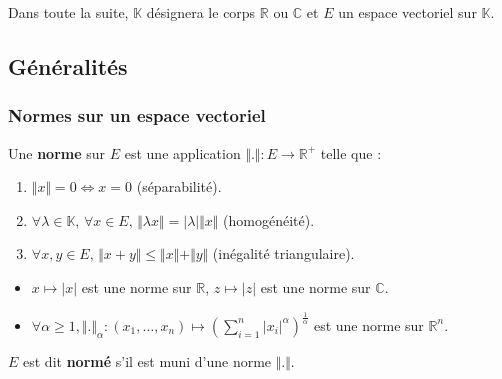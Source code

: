 




  Dans toute la suite, $\mathbb{K}$ désignera le corps $\mathbb{R}$ ou $\mathbb{C}$ et $E$ un espace vectoriel sur $\mathbb{K}$.

  \subsection{Généralités}

  \subsubsection{Normes sur un espace vectoriel}


  \begin{definition}
    Une \textbf{norme} sur $E$ est une application $\Vert . \Vert : E \rightarrow \mathbb{R}^+$ telle que :
    \begin{enumerate}[label={\bfseries(\roman*)}]
      \item $\Vert x \Vert = 0 \iff x = 0$ (séparabilité).
      \item $\forall \lambda \in \mathbb{K}, \, \forall x \in E, \, \Vert \lambda x \Vert = \vert \lambda \vert \Vert x \Vert$ (homogénéité).
      \item $\forall x, y \in E, \, \Vert x + y \Vert \leq \Vert x \Vert + \Vert y \Vert$ (inégalité triangulaire).
    \end{enumerate}
  \end{definition}

  \begin{example}
    \label{208-1}
    \begin{itemize}
      \item $x \mapsto \vert x \vert$ est une norme sur $\mathbb{R}$, $z \mapsto \vert z \vert$ est une norme sur $\mathbb{C}$.
      \item $\forall \alpha \geq 1, \Vert . \Vert_\alpha : (x_1, \dots, x_n) \mapsto \left(\sum_{i=1}^n \vert x_i \vert^\alpha\right)^{\frac{1}{\alpha}}$ est une norme sur $\mathbb{R}^n$.
    \end{itemize}
  \end{example}


  \begin{definition}
    $E$ est dit \textbf{normé} s'il est muni d'une norme $\Vert . \Vert$.
  \end{definition}

